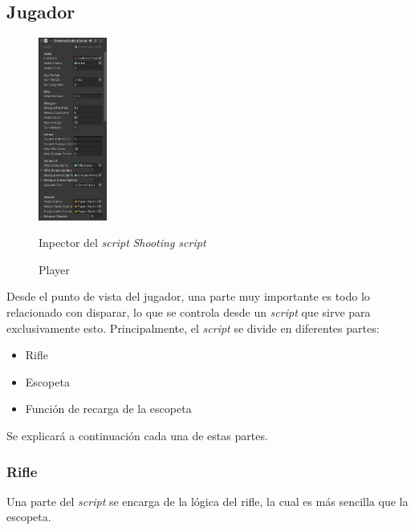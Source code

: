 \documentclass[11pt]{article}
\begin{document}
    \subsection{Jugador}

    \begin{figure}
        \begin{center}
            \includegraphics[width=0.2\textwidth]{Images/ShootyMacShooty/rifleinspector.png}
            \caption*{Inpector del \textit{script} \textit{Shooting \textit{script}}}
        \end{center}
        \caption{Player}
    
    \end{figure}        

        Desde el punto de vista del jugador, una parte muy importante es todo lo relacionado con disparar, lo que se controla desde un \textit{script} que sirve para exclusivamente esto. Principalmente, el \textit{script} se divide en diferentes partes:

        \begin{itemize}
            \item Rifle 
            \item Escopeta
            \item Función de recarga de la escopeta
        \end{itemize}
        Se explicará a continuación cada una de estas partes.\\
        \newpage

        \subsubsection{Rifle} \label{rifle}
            Una parte del \textit{script} se encarga de la lógica del rifle, la cual es más sencilla que la escopeta.
\end{document}

